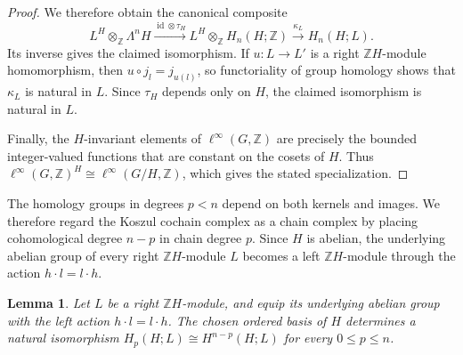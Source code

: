 \documentclass[pdflatex,sn-mathphys-num]{sn-jnl}%
\theoremstyle{plain}
\newtheorem{lemma}[theorem]{Lemma}
\theoremstyle{remark}
\theoremstyle{definition}
\numberwithin{equation}{section}
\begin{document}
\begin{proof}
We therefore obtain the canonical composite
\[
L^H\otimes_{\mathbb Z}\Lambda^nH
\xrightarrow{\operatorname{id}\otimes\tau_H}
L^H\otimes_{\mathbb Z}H_n(H;\mathbb Z)
\xrightarrow{\kappa_L}
H_n(H;L).
\]
Its inverse gives the claimed isomorphism. If \( u\colon L\to L' \) is a right \( \mathbb ZH \)-module homomorphism, then \( u\circ j_l=j_{u(l)} \), so functoriality of group homology shows that \( \kappa_L \) is natural in \( L \). Since \( \tau_H \) depends only on \( H \), the claimed isomorphism is natural in \( L \).

Finally, the \( H \)-invariant elements of \( \ell^\infty(G,\mathbb Z) \) are precisely the bounded integer-valued functions that are constant on the cosets of \( H \). Thus \( \ell^\infty(G,\mathbb Z)^H\cong\ell^\infty(G/H,\mathbb Z) \), which gives the stated specialization.
\end{proof}

The homology groups in degrees \( p<n \) depend on both kernels and images. We therefore regard the Koszul cochain complex as a chain complex by placing cohomological degree \( n-p \) in chain degree \( p \). Since \( H \) is abelian, the underlying abelian group of every right \( \mathbb ZH \)-module \( L \) becomes a left \( \mathbb ZH \)-module through the action \( h\cdot l=l\cdot h \).

\begin{lemma}
\label{lem:koszul-self-duality}
Let \( L \) be a right \( \mathbb ZH \)-module, and equip its underlying abelian group with the left action \( h\cdot l=l\cdot h \). The chosen ordered basis of \( H \) determines a natural isomorphism \( H_p(H;L)\cong H^{n-p}(H;L) \) for every \( 0\leq p\leq n \).
\end{lemma}
\end{document}
